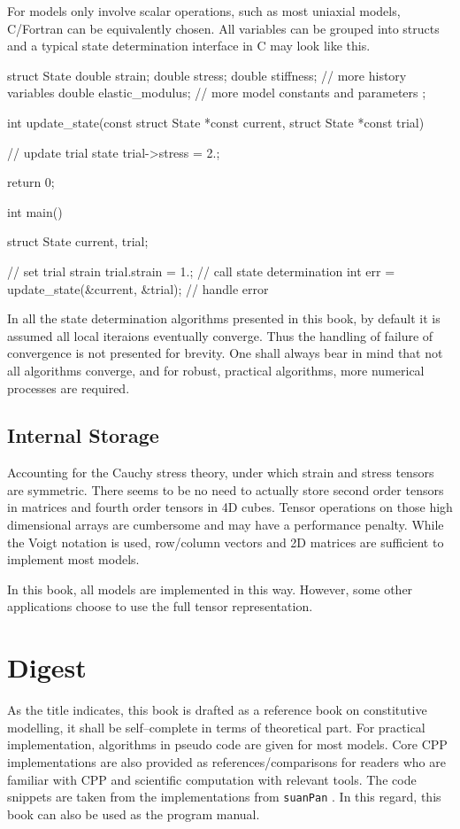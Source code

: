 For models only involve scalar operations, such as most uniaxial models, C/Fortran can be equivalently chosen. All variables can be grouped into structs and a typical state determination interface in C may look like this.
\begin{cppcode}
struct State
{
    double strain;
    double stress;
    double stiffness;
    // more history variables
    double elastic_modulus;
    // more model constants and parameters
};

int update_state(const struct State *const current, struct State *const trial){
    // update trial state
    trial->stress = 2.;

    return 0;
}

int main()
{
    struct State current, trial;

    // set trial strain
    trial.strain = 1.;
    // call state determination
    int err = update_state(&current, &trial);
    // handle error
}
\end{cppcode}

In all the state determination algorithms presented in this book, by default it is assumed all local iteraions eventually converge. Thus the handling of failure of convergence is not presented for brevity. One shall always bear in mind that not all algorithms converge, and for robust, practical algorithms, more numerical processes are required.
\subsection{Internal Storage}
Accounting for the Cauchy stress theory, under which strain and stress tensors are symmetric.
There seems to be no need to actually store second order tensors in matrices and fourth order tensors in 4D cubes.
Tensor operations on those high dimensional arrays are cumbersome and may have a performance penalty.
While the Voigt notation is used, row/column vectors and 2D matrices are sufficient to implement most models.

In this book, all models are implemented in this way.
However, some other applications choose to use the full tensor representation.
\section{Digest}
As the title indicates, this book is drafted as a reference book on constitutive modelling, it shall be self--complete in terms of theoretical part. For practical implementation, algorithms in pseudo code are given for most models. Core CPP implementations are also provided as references/comparisons for readers who are familiar with CPP and scientific computation with relevant tools. The code snippets are taken from the implementations from \texttt{suanPan} \cite{Chang2022}. In this regard, this book can also be used as the program manual.